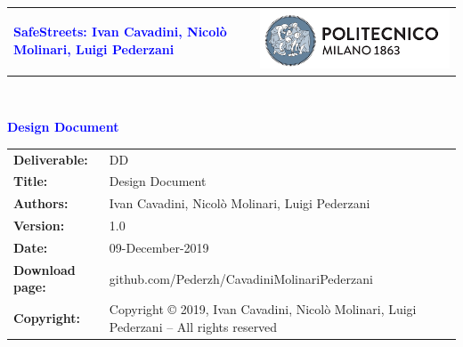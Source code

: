 




\begin{titlepage}



{\begin{table}[t!]
\centering
\begin{tabu} to \textwidth { X[1.3,r,p] X[1.7,l,p] }
\textcolor{Blue}
{\textbf{\small{SafeStreets: Ivan Cavadini, Nicolò Molinari, Luigi Pederzani}}} & \includegraphics[scale=0.5]{Images/PolimiLogo}
\end{tabu}
\end{table}}~\\ [7cm]


\begin{flushleft}

{\textcolor{Blue}{\textbf{\Huge{Design Document}}}} \\ [1cm]

\end{flushleft}

\end{titlepage}

\begin{table}[h!]
\begin{tabu} to \textwidth { X[0.3,r,p] X[0.7,l,p] }
\hline

\textbf{Deliverable:} & DD\\
\textbf{Title:} & Design Document \\
\textbf{Authors:} & Ivan Cavadini, Nicolò Molinari, Luigi Pederzani \\
\textbf{Version:} & 1.0 \\ 
\textbf{Date:} & 09-December-2019 \\
\textbf{Download page:} & github.com/Pederzh/CavadiniMolinariPederzani \\
\textbf{Copyright:} & Copyright © 2019, Ivan Cavadini, Nicolò Molinari, Luigi Pederzani – All rights reserved \\
\hline
\end{tabu}
\end{table}




